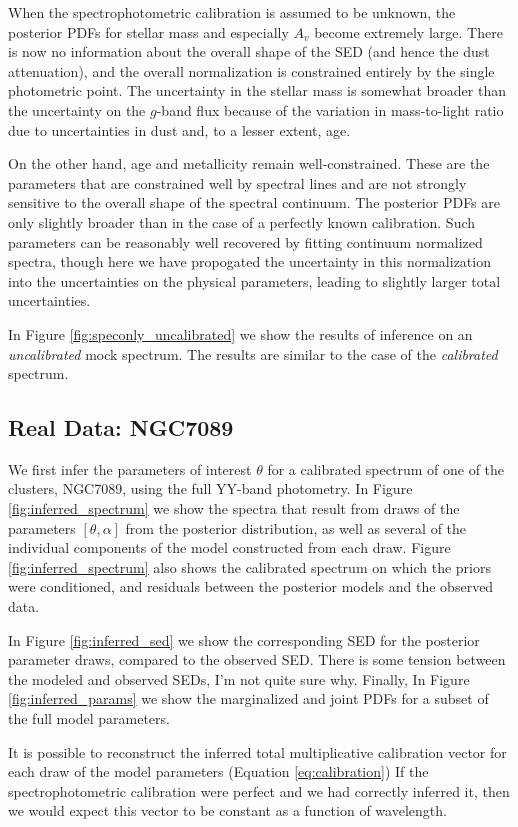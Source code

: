 \documentclass[iop,numberedappendix]{emulateapj}
\newcommand{\excluster}{NGC7089}
\begin{document}
When the spectrophotometric calibration is assumed to be unknown,
the posterior PDFs for stellar mass and especially $A_v$ become
extremely large.  There is now no information about the overall shape
of the SED (and hence the dust attenuation), and the overall
normalization is constrained entirely by the single photometric point.
The uncertainty in the stellar mass is somewhat broader than the
uncertainty on the $g$-band flux because of the variation in
mass-to-light ratio due to uncertainties in dust and, to a lesser
extent, age.

On the other hand, age and metallicity remain well-constrained.  These
are the parameters that are constrained well by spectral lines and are
not strongly sensitive to the overall shape of the spectral continuum.
The posterior PDFs are only slightly broader than in the case of a
perfectly known calibration. Such parameters can be reasonably well
recovered by fitting continuum normalized spectra, though here we have
propogated the uncertainty in this normalization into the
uncertainties on the physical parameters, leading to slightly larger
total uncertainties.

In Figure \ref{fig:speconly_uncalibrated} we show the results of
inference on an \emph{uncalibrated} mock spectrum.  The results are
similar to the case of the \emph{calibrated} spectrum.


\subsection{Real Data: \excluster} 
We first infer the parameters of interest $\theta$ for a calibrated
spectrum of one of the clusters, \excluster, using the full YY-band
photometry. In Figure \ref{fig:inferred_spectrum} we show the spectra
that result from draws of the parameters $[\theta,\alpha]$ from the
posterior distribution, as well as several of the individual
components of the model constructed from each draw. Figure
\ref{fig:inferred_spectrum} also shows the calibrated spectrum on
which the priors were conditioned, and residuals between the posterior
models and the observed data.  

In Figure \ref{fig:inferred_sed} we show the corresponding SED for the
posterior parameter draws, compared to the observed SED. There is some
tension between the modeled and observed SEDs, I'm not quite sure
why. Finally, In Figure \ref{fig:inferred_params} we show the
marginalized and joint PDFs for a subset of the full model parameters.

It is possible to reconstruct the inferred total multiplicative
calibration vector for each draw of the model parameters (Equation
\ref{eq:calibration}) If the spectrophotometric calibration were
perfect and we had correctly inferred it, then we would expect this
vector to be constant as a function of wavelength.
\end{document}
